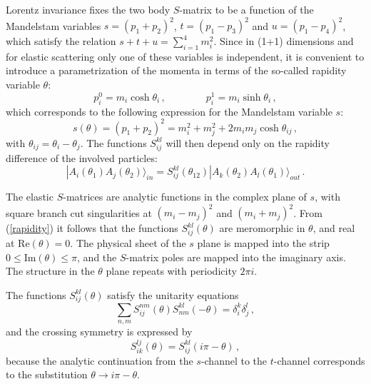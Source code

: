 \documentclass[a4paper,12pt]{report}
\begin{document}
\vspace{0.5cm}

Lorentz invariance fixes the two body $S$-matrix to be a function of the Mandelstam variables
$s=\left(p_{1}+p_{2}\right)^{2}$, $t=\left(p_{1}-p_{3}\right)^{2}$ and $u=\left(p_{1}-p_{4}\right)^{2}$, which
satisfy the relation $s+t+u=\sum_{i=1}^{4}m_{i}^{2}$. Since in (1+1) dimensions and for elastic scattering only
one of these variables is independent, it is convenient to introduce a parametrization of the momenta in terms of
the so-called rapidity variable $\theta$:
\begin{equation}
p_{i}^{0}=m_{i}\cosh\theta_{i}\,,\qquad\qquad p_{i}^{1}=m_{i}\sinh\theta_{i}\,,
\end{equation}
which corresponds to the following expression for the Mandelstam variable $s$:
\begin{equation}\label{rapidity}
s(\theta)=\left(p_{1}+p_{2}\right)^{2}=m_{i}^{2}+m_{j}^{2}+2m_{i}m_{j}\cosh\theta_{ij}\,,
\end{equation}
with $\theta_{ij}=\theta_{i}-\theta_{j}$. The functions $S_{ij}^{kl}$ will then depend only on the rapidity
difference of the involved particles:
\begin{equation}
|A_{i}\left(\theta_{1}\right)A_{j}\left(\theta_{2}\right)\rangle_{in}=S_{ij}^{kl}\left(\theta_{12}\right)|
A_{k}\left(\theta_{2}\right)A_{l}\left(\theta_{1}\right)\rangle_{out}\,.
\end{equation}

The elastic $S$-matrices are analytic functions in the complex plane of $s$, with square branch cut singularities
at $\left(m_{i}-m_{j}\right)^{2}$ and $\left(m_{i}+m_{j}\right)^{2}$. From (\ref{rapidity}) it follows that the
functions $S_{ij}^{kl}\left(\theta\right)$ are meromorphic in $\theta$, and real at $\textrm{Re}(\theta)=0$. The
physical sheet of the $s$ plane is mapped into the strip $0\leq \textrm{Im}(\theta)\leq\pi$, and the $S$-matrix
poles are mapped into the imaginary axis. The structure in the $\theta$ plane repeats with periodicity $2\pi i$.


The functions $S_{ij}^{kl}\left(\theta\right)$ satisfy the unitarity equations
\begin{equation}\label{unitbulk}
\sum_{n,m}S_{ij}^{nm}\left(\theta\right)S_{nm}^{kl}\left(-\theta\right)=\delta_{i}^{k}\delta_{j}^{l}\,,
\end{equation}
and the crossing symmetry is expressed by
\begin{equation}\label{crossbulk}
S_{ik}^{lj}\left(\theta\right)=S_{ij}^{kl}\left(i\pi-\theta\right)\,,
\end{equation}
because the analytic continuation from the $s$-channel to the $t$-channel corresponds to the substitution
$\theta\rightarrow i\pi-\theta$.
\end{document}
